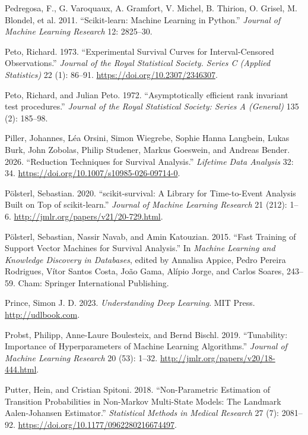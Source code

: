 \documentclass[
  letterpaper,
  krantz2]{style/krantz}
\newlength{\cslhangindent}
\newenvironment{CSLReferences}[2] %
 {\begin{list}{}{%
  \setlength{\itemindent}{0pt}
  \setlength{\leftmargin}{0pt}
  \setlength{\parsep}{0pt}
  \ifodd #1
   \setlength{\leftmargin}{\cslhangindent}
   \setlength{\itemindent}{-1\cslhangindent}
  \fi
  \setlength{\itemsep}{#2\baselineskip}}}
 {\end{list}}
\begin{document}
\begin{CSLReferences}{1}{0}
Pedregosa, F., G. Varoquaux, A. Gramfort, V. Michel, B. Thirion, O.
Grisel, M. Blondel, et al. 2011. {``{Scikit-learn: Machine Learning in
Python}.''} \emph{Journal of Machine Learning Research} 12: 2825--30.

Peto, Richard. 1973. {``Experimental Survival Curves for
Interval-Censored Observations.''} \emph{Journal of the Royal
Statistical Society. Series C (Applied Statistics)} 22 (1): 86--91.
\url{https://doi.org/10.2307/2346307}.

Peto, Richard, and Julian Peto. 1972. {``{Asymptotically efficient rank
invariant test procedures}.''} \emph{Journal of the Royal Statistical
Society: Series A (General)} 135 (2): 185--98.

Piller, Johannes, Léa Orsini, Simon Wiegrebe, Sophie Hanna Langbein,
Lukas Burk, John Zobolas, Philip Studener, Markus Goeswein, and Andreas
Bender. 2026. {``Reduction Techniques for Survival Analysis.''}
\emph{Lifetime Data Analysis} 32: 34.
\url{https://doi.org/10.1007/s10985-026-09714-0}.

Pölsterl, Sebastian. 2020. {``{scikit-survival: A Library for
Time-to-Event Analysis Built on Top of scikit-learn}.''} \emph{Journal
of Machine Learning Research} 21 (212): 1--6.
\url{http://jmlr.org/papers/v21/20-729.html}.

Pölsterl, Sebastian, Nassir Navab, and Amin Katouzian. 2015. {``Fast
Training of Support Vector Machines for Survival Analysis.''} In
\emph{Machine Learning and Knowledge Discovery in Databases}, edited by
Annalisa Appice, Pedro Pereira Rodrigues, Vítor Santos Costa, João Gama,
Alípio Jorge, and Carlos Soares, 243--59. Cham: Springer International
Publishing.

Prince, Simon J. D. 2023. \emph{{Understanding Deep Learning}}. MIT
Press. \url{http://udlbook.com}.

Probst, Philipp, Anne-Laure Boulesteix, and Bernd Bischl. 2019.
{``Tunability: Importance of Hyperparameters of Machine Learning
Algorithms.''} \emph{Journal of Machine Learning Research} 20 (53):
1--32. \url{http://jmlr.org/papers/v20/18-444.html}.

Putter, Hein, and Cristian Spitoni. 2018. {``Non-Parametric Estimation
of Transition Probabilities in Non-{Markov} Multi-State Models: The
Landmark {Aalen}-{Johansen} Estimator.''} \emph{Statistical Methods in
Medical Research} 27 (7): 2081--92.
\url{https://doi.org/10.1177/0962280216674497}.


\end{CSLReferences}
\end{document}
